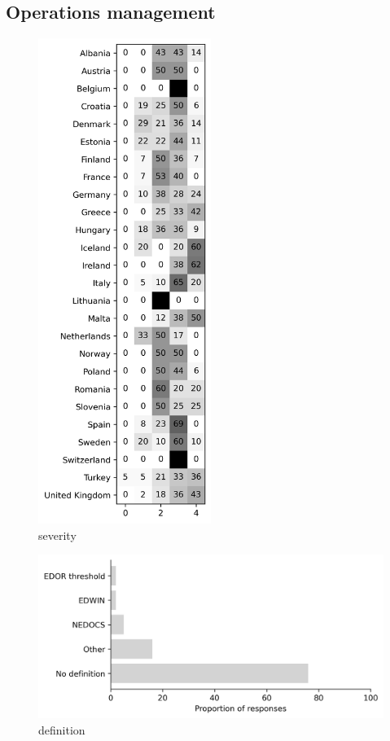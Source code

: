 \documentclass{article}
\begin{document}
\subsection{Operations management}

\begin{figure}[H]
    \centering
        \includegraphics[width=0.5\textwidth]{../output/plots/severity}
        \caption{severity}
        \label{fig:severity}
\end{figure}

\begin{figure}[H]
    \centering
        \includegraphics[width=1.0\textwidth]{../output/plots/definition}
        \caption{definition}
        \label{fig:definition}
\end{figure}
\end{document}
